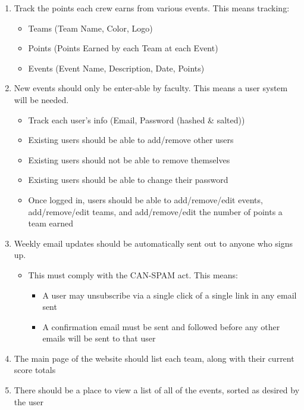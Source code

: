 \documentclass{scrreprt}
\begin{document}
    \begin{enumerate}
        \item Track the points each crew earns from various events.  This means tracking:
        \begin{itemize}
            \item Teams (Team Name, Color, Logo)
            \item Points (Points Earned by each Team at each Event)
            \item Events (Event Name, Description, Date, Points)
        \end{itemize}
        
        \item New events should only be enter-able by faculty. This means a user system will be needed.
        \begin{itemize}
            \item Track each user's info (Email, Password (hashed & salted))
            \item Existing users should be able to add/remove other users
            \item Existing users should not be able to remove themselves
            \item Existing users should be able to change their password
            \item Once logged in, users should be able to add/remove/edit events, add/remove/edit teams, and add/remove/edit the number of points a team earned
        \end{itemize}
        \item Weekly email updates should be automatically sent out to anyone who signs up.
        \begin{itemize}
            \item This must comply with the CAN-SPAM act. This means:
            \begin{itemize}
                \item A user may unsubscribe via a single click of a single link in any email sent
                \item A confirmation email must be sent and followed before any other emails will be sent to that user
            \end{itemize}
        \end{itemize}
        \item The main page of the website should list each team, along with their current score totals
        \item There should be a place to view a list of all of the events, sorted as desired by the user        
    \end{enumerate}
    
\end{document}

